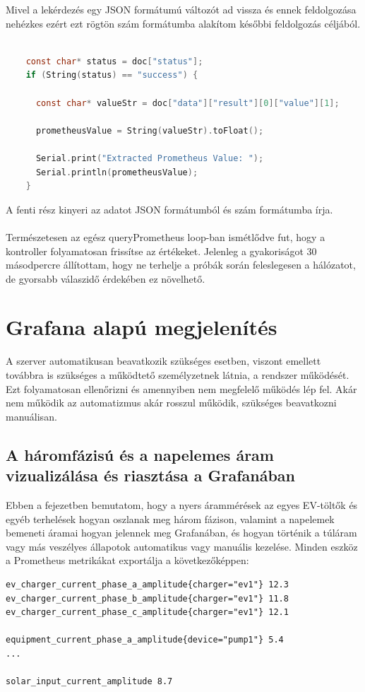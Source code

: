 Mivel a lekérdezés egy JSON formátumú változót ad vissza és ennek feldolgozása nehézkes ezért ezt rögtön szám 
formátumba alakítom későbbi feldolgozás céljából.

\begin{lstlisting}[language=C]
    
    const char* status = doc["status"];
    if (String(status) == "success") {
      
      const char* valueStr = doc["data"]["result"][0]["value"][1];
      
      prometheusValue = String(valueStr).toFloat();

      Serial.print("Extracted Prometheus Value: ");
      Serial.println(prometheusValue);
    }
\end{lstlisting}

A fenti rész kinyeri az adatot JSON formátumból és szám formátumba írja.\\
\\
Természetesen az egész queryPrometheus loop-ban ismétlődve fut, hogy a kontroller folyamatosan frissítse az értékeket. 
Jelenleg a gyakoriságot 30 másodpercre állítottam, hogy ne terhelje a próbák során feleslegesen a hálózatot, 
de gyorsabb válaszidő érdekében ez növelhető.

\section{Grafana alapú megjelenítés}

A szerver automatikusan beavatkozik szükséges esetben, viszont emellett továbbra 
is szükséges a működtető személyzetnek látnia, a rendszer működését. Ezt folyamatosan 
ellenőrizni és amennyiben nem megfelelő működés lép fel. Akár nem működik az 
automatizmus akár rosszul működik, szükséges beavatkozni manuálisan.

\subsection{A háromfázisú és a napelemes áram vizualizálása és riasztása a Grafanában}
Ebben a fejezetben bemutatom, hogy a nyers árammérések az egyes EV-töltők és 
egyéb terhelések hogyan oszlanak meg három fázison, valamint a napelemek 
bemeneti áramai hogyan jelennek meg Grafanában, és hogyan történik a 
túláram vagy más veszélyes állapotok automatikus vagy manuális kezelése. 
Minden eszköz a Prometheus metrikákat exportálja a következőképpen:

\begin{lstlisting}
ev_charger_current_phase_a_amplitude{charger="ev1"} 12.3
ev_charger_current_phase_b_amplitude{charger="ev1"} 11.8
ev_charger_current_phase_c_amplitude{charger="ev1"} 12.1

equipment_current_phase_a_amplitude{device="pump1"} 5.4
... 

solar_input_current_amplitude 8.7
\end{lstlisting}

